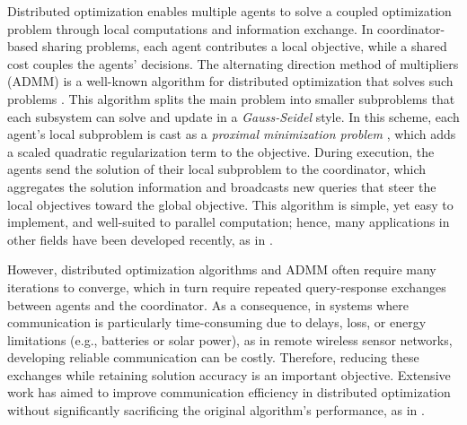 \documentclass[conference]{IEEEtran}
\newcommand{\AD}[1]{}
\begin{document}
Distributed optimization enables multiple agents to solve a coupled optimization problem through local computations and information exchange. In coordinator-based sharing problems, each agent contributes a local objective, while a shared cost couples the agents' decisions. 
The alternating direction method of multipliers (ADMM) is a well-known algorithm for distributed optimization that solves such problems \cite{boyd2011distributed}. 
This algorithm splits the main problem into smaller subproblems that each subsystem can solve and update in a \textit{Gauss-Seidel} style. 
In this scheme, each agent's local subproblem is cast as a \textit{proximal minimization problem} \cite{10.1561/2400000003}, which adds a scaled quadratic regularization term to the objective. During execution, the agents send the solution of their local subproblem to the coordinator, which aggregates the solution information and broadcasts new queries that steer the local objectives toward the global objective.
This algorithm is simple, yet easy to implement, and well-suited to parallel computation; hence, many applications in other fields have been developed recently, as in \cite{er2024distributed, 10443910, 11143820, he_admm_2025}. 

However, distributed optimization algorithms and ADMM often require many iterations to converge, which in turn require repeated query-response exchanges between agents and the coordinator. As a consequence, in systems where communication is particularly time-consuming due to delays, loss, or energy limitations (e.g., batteries or solar power), as in remote wireless sensor networks, developing reliable communication can be costly. Therefore, reducing these exchanges while retaining solution accuracy is an important objective. Extensive work has aimed to improve communication efficiency in distributed optimization without significantly sacrificing the original algorithm's performance, as in \cite{JMLR:v18:16-512, pmlr-v108-li20f, duarte2024communication, 8673589}.

\end{document}
